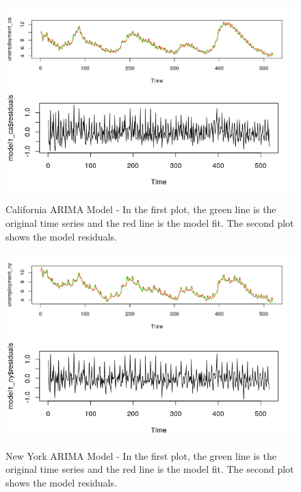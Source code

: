 \documentclass{article}
\begin{document}
 \begin{figure}[H]
 	
 	\includegraphics[width=330pt]{ca_arima_fit}
 	\includegraphics[width=330pt]{CA_residuals}
 	\caption{California ARIMA Model -  In the first plot, the green line is the original time series and the red line is the model fit. The second plot shows the model residuals.} 
 \end{figure}
 \begin{figure}[H]
	
	\includegraphics[width=330pt]{ny_arima_fit}
	\includegraphics[width=330pt]{ny_residuals}
	\caption{New York ARIMA Model -  In the first plot, the green line is the original time series and the red line is the model fit. The second plot shows the model residuals.} 
\end{figure}
\end{document}
